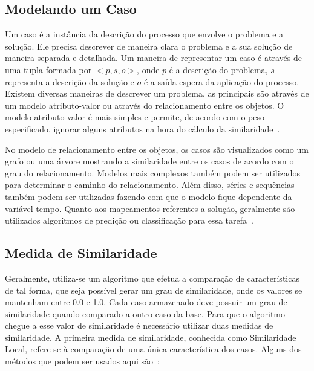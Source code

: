 \subsection{Modelando um Caso}
\label{sec:casemodeling}

Um caso é a instância da descrição do processo que envolve o problema e a solução. Ele precisa descrever de maneira clara o problema e a sua solução de maneira separada e detalhada. Um maneira de representar um caso é através de uma tupla formada por $<p, s, o>$, onde $p$ é a descrição do problema, $s$ representa a descrição da solução e $o$ é a saída espera da aplicação do processo. Existem diversas maneiras de descrever um problema, as principais são através de um modelo atributo-valor ou através do relacionamento entre os objetos. O modelo atributo-valor é mais simples e permite, de acordo com o peso especificado, ignorar alguns atributos na hora do cálculo da similaridade~\cite{Lopez:2013}.

No modelo de relacionamento entre os objetos, os casos são visualizados como um grafo ou uma árvore mostrando a similaridade entre os casos de acordo com o grau do relacionamento. Modelos mais complexos também podem ser utilizados para determinar o caminho do relacionamento. Além disso, séries e sequências também podem ser utilizadas fazendo com que o modelo fique dependente da variável tempo. Quanto aos mapeamentos referentes a solução, geralmente são utilizados algoritmos de predição ou classificação para essa tarefa~\cite{Lopez:2013}.

\subsection{Medida de Similaridade}
\label{sec:medidasimilaridade}

Geralmente, utiliza-se um algoritmo que efetua a comparação de características de tal forma, que seja possível gerar um grau de similaridade, onde os valores se mantenham entre 0.0 e 1.0. Cada caso armazenado deve possuir um grau de similaridade quando comparado a outro caso da base. Para que o algoritmo chegue a esse valor de similaridade é necessário utilizar duas medidas de similaridade. A primeira medida de similaridade, conhecida como Similaridade Local, refere-se à comparação de uma única característica dos casos. Alguns dos métodos que podem ser usados aqui são~\cite{Gresse:2003}:

